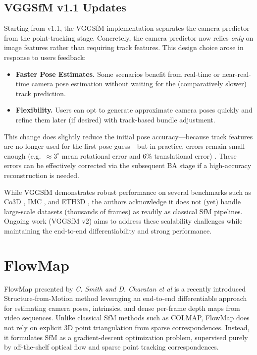\subsection*{VGGSfM v1.1 Updates}
Starting from v1.1, the VGGSfM implementation separates the camera predictor from the point-tracking stage. 
Concretely, the camera predictor now relies \emph{only} on image features rather than requiring track features. 
This design choice arose in response to users feedback:
\begin{itemize}
    \item \textbf{Faster Pose Estimates.} Some scenarios benefit from real-time or near-real-time camera pose estimation without waiting for the (comparatively slower) track prediction.
    \item \textbf{Flexibility.} Users can opt to generate approximate camera poses quickly and refine them later (if desired) with track-based bundle adjustment.
\end{itemize}
This change does slightly reduce the initial pose accuracy—because track features are no longer used for the first pose guess—but in practice, errors remain small enough (e.g.\ $\approx 3^\circ$ mean rotational error and $6\%$ translational error) \cite{VGGSFM_GitHubIssue}. 
These errors can be effectively corrected via the subsequent BA stage if a high-accuracy reconstruction is needed.


While VGGSfM demonstrates robust performance on several benchmarks such as Co3D \cite{reizenstein21co3d}, IMC \cite{Jin_2020}, and ETH3D \cite{schoeps2017cvpr}, the authors acknowledge it does not (yet) handle large-scale datasets (thousands of frames) as readily as classical SfM pipelines. Ongoing work (VGGSfM v2) aims to address these scalability challenges while maintaining the end-to-end differentiability and strong performance.
\section{FlowMap}\label{sec:flowmap}


FlowMap \cite{smith24flowmap} presented by \textit{C. Smith and D. Charatan et al} is a recently introduced Structure-from-Motion method leveraging an end-to-end differentiable approach for estimating camera poses, intrinsics, and dense per-frame depth maps from video sequences. 
Unlike classical SfM methods such as COLMAP, FlowMap does not rely on explicit 3D point triangulation from sparse correspondences. 
Instead, it formulates SfM as a gradient-descent optimization problem, supervised purely by off-the-shelf optical flow and sparse point tracking correspondences.

